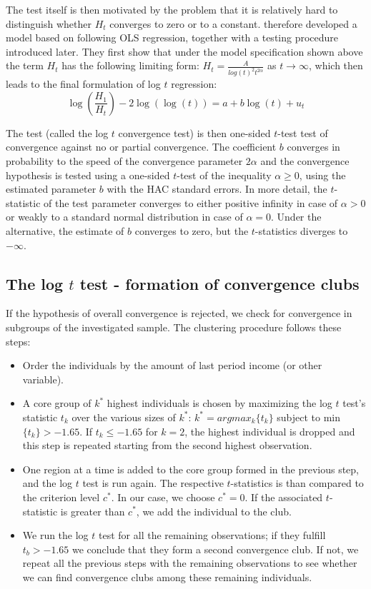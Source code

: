 \documentclass[11pt]{article}
\begin{document}
The test itself is then motivated by the problem that it is relatively hard to distinguish whether $H_t$ converges to zero or to a constant. \citet{phillips2007transition} therefore developed a model based on following OLS regression, together with a testing procedure introduced later. They first show that under the model specification shown above the term $H_{t}$ has the following limiting form: \(H_{t} = \frac{A}{log (t)^2t^{2\alpha}}\) as \(t \rightarrow \infty\), which then leads to the final formulation of log $t$ regression:
\begin{equation}\label{eq10}\log(\frac{H_1}{H_t})-2\log(\log(t)) = a + b\log(t) + u_t\end{equation}

The test (called the log $t$ convergence test) is then one-sided $t$-test test of convergence against no or partial convergence. The coefficient $b$ converges in probability to the speed of the convergence parameter $2\alpha$ and the convergence hypothesis is tested using a one-sided $t$-test of the inequality \(\alpha \geq 0 \), using the estimated parameter $b$ with the HAC standard errors. In more detail, the $t$-statistic of the test parameter converges to either positive infinity in case of \(\alpha > 0 \) or weakly to a standard normal distribution in case of \(\alpha = 0\). Under the alternative, the estimate of $b$ converges to zero, but the $t$-statistics diverges to $-\infty$.

\subsection{The log $t$ test - formation of convergence clubs }
If the hypothesis of overall convergence is rejected, we check for convergence in subgroups of the investigated sample. The clustering procedure follows these steps:
\begin{itemize}
    \item Order the individuals by the amount of last period income (or other variable).
    \item  A core group of $k^{*}$ highest individuals is chosen by maximizing the log $t$ test's statistic $t_{k}$ over the various sizes of $k^{*}$:
    \(k^{*} = arg max_{k}\{t_{k}\}\) subject to min \( \{t_{k}\}> -1.65\). If \(t_{k} \leq -1.65 \) for \(k=2\), the highest individual is dropped and this step is repeated starting from the second highest observation. 
    \item One region at a time is added to the core group formed in the previous step, and the log $t$ test is run again. The respective  $t$-statistics is than compared to the criterion level $c^{*}$. In our case, we choose $c^{*}=0$. If the associated $t$-statistic is greater than  $c^{*}$, we add the individual to the club.
    \item We run the log $t$ test for all the remaining observations; if they fulfill \(t_b > -1.65\) we conclude that they form a second convergence club. If not, we repeat all the previous steps with the remaining observations to see whether we can find convergence clubs among these remaining individuals.
\end{itemize}    
\end{document}
